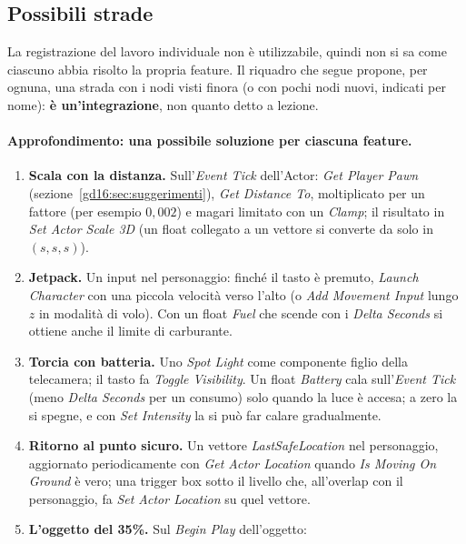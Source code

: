 \subsection{Possibili strade}

La registrazione del lavoro individuale non è utilizzabile, quindi non si sa
come ciascuno abbia risolto la propria feature. Il riquadro che segue propone,
per ognuna, una strada con i nodi visti finora (o con pochi nodi nuovi, indicati
per nome): \textbf{è un'integrazione}, non quanto detto a lezione.

\paragraph{Approfondimento: una possibile soluzione per ciascuna feature.}
\begin{enumerate}
  \item \textbf{Scala con la distanza.} Sull'\emph{Event Tick} dell'Actor:
        \emph{Get Player Pawn} (sezione~\ref{gd16:sec:suggerimenti}),
        \emph{Get Distance To}, moltiplicato per un fattore (per esempio
        $0{,}002$) e magari limitato con un \emph{Clamp}; il risultato in
        \emph{Set Actor Scale 3D} (un float collegato a un vettore si converte
        da solo in $(s,s,s)$).
  \item \textbf{Jetpack.} Un input nel personaggio: finché il tasto è premuto,
        \emph{Launch Character} con una piccola velocità verso l'alto (o
        \emph{Add Movement Input} lungo $z$ in modalità di volo). Con un float
        \emph{Fuel} che scende con i \emph{Delta Seconds} si ottiene anche il
        limite di carburante.
  \item \textbf{Torcia con batteria.} Uno \emph{Spot Light} come componente figlio
        della telecamera; il tasto fa \emph{Toggle Visibility}. Un float
        \emph{Battery} cala sull'\emph{Event Tick} (meno \emph{Delta Seconds}
        per un consumo) solo quando la luce è accesa; a zero la si spegne, e
        con \emph{Set Intensity} la si può far calare gradualmente.
  \item \textbf{Ritorno al punto sicuro.} Un vettore \emph{LastSafeLocation}
        nel personaggio, aggiornato periodicamente con \emph{Get Actor
        Location} quando \emph{Is Moving On Ground} è vero; una trigger box
        sotto il livello che, all'overlap con il personaggio, fa \emph{Set Actor
        Location} su quel vettore.
  \item \textbf{L'oggetto del 35\%.} Sul \emph{Begin Play} dell'oggetto:

\end{enumerate}
